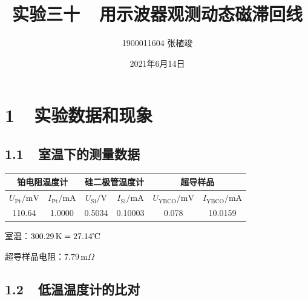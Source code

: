\documentclass[a4paper,fontset=windows]{ctexart}
\begin{document}
\title{\textbf{实验三十\ \ 用示波器观测动态磁滞回线}}
\author{1900011604 张植竣}
\date{2021年6月14日}

\maketitle

\section*{1\ \ 实验数据和现象}

\subsection*{1.1\ \ 室温下的测量数据}

\begin{table}[!ht]
    \begin{center}
        \begin{tabular}{|c|c|c|c|c|c|}
            \hline
            \multicolumn{2}{|c|}{铂电阻温度计} & \multicolumn{2}{|c|}{硅二极管温度计} & \multicolumn{2}{|c|}{超导样品} \\
            \hline
            $U_\mathrm{Pt}/\mathrm{mV}$ & $I_\mathrm{Pt}/\mathrm{mA}$ & $U_\mathrm{Si}/\mathrm{V}$ & $I_\mathrm{Si}/\mathrm{mA}$ & $U_\mathrm{YBCO}/\mathrm{mV}$ & $I_\mathrm{YBCO}/\mathrm{mA}$ \\
            \hline
            110.64 & 1.0000 & 0.5034 & 0.10003 & 0.078 & 10.0159 \\
            \hline
        \end{tabular}
    \end{center}
\end{table}

室温：$300.29\,\mathrm{K}=27.14\text{\textcelsius}$

超导样品电阻：$7.79\,\mathrm{m}\Omega$

\subsection*{1.2\ \ 低温温度计的比对}
\end{document}
